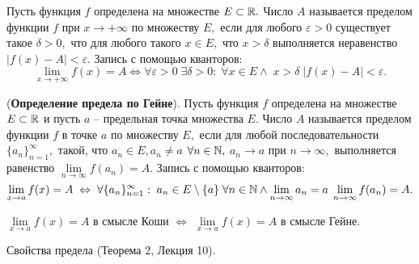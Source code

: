 \begin{definition}
	Пусть функция $f$ определена на множестве
	$E\subset\mathbb{R}.$ Число $A$ называется
	пределом функции $f$ при
	$x\rightarrow+\infty$ по множеству
	$E,$ если для любого $\varepsilon>0$
	существует такое $\delta>0,$ что
	для любого такого $x\in E,$ что
	$x>\delta$
	выполняется неравенство $|f(x)-A|<\varepsilon.$
	Запись с помощью кванторов:
	$$
		\lim\limits_{x\rightarrow +\infty}f(x)=A\Leftrightarrow
		\forall\varepsilon>0\;\exists\delta>0:\;
		\forall x \in E\wedge\;x>\delta\;
		|f(x)-A|<\varepsilon.
	$$
\end{definition}

\begin{definition}
	(\textbf{Определение предела по Гейне}).
	Пусть функция $f$ определена на множестве
	$E\subset\mathbb{R}$ и пусть $a$ -- предельная
	точка множества $E.$ Число $A$ называется
	пределом функции $f$ в точке $a$ по множеству
	$E,$ если для любой последовательности
	$\{a_n\}_{n=1}^{\infty},$ такой, что
	$a_n \in E, a_n\neq a$
	$\forall n \in \mathbb{N},$ $a_n\rightarrow a$
	при $n\rightarrow\infty,$
	выполняется равенство $\lim
		\limits_{n\rightarrow\infty}f(a_n)=A.$
	Запись с помощью кванторов:
	$$
		\lim\limits_{x\rightarrow a}f(x)=A\;\Leftrightarrow\;
		\forall \{a_n\}_{n=1}^{\infty}:\;
		a_n \in E\setminus\{a\}\;\forall n \in \mathbb{N}\wedge
		\lim\limits_{n\rightarrow\infty}a_n=a\;
		\lim\limits_{n\rightarrow\infty}f(a_n)=A.
	$$
\end{definition}

\begin{theorem}
	$\lim\limits_{x\rightarrow a}f(x)=A$ в смысле Коши
	$\Leftrightarrow$
	$\lim\limits_{x\rightarrow a}f(x)=A$ в смысле Гейне.
\end{theorem}

\newpage
\begin{problem}
Свойства предела (Теорема 2, Лекция 10).
\end{problem}

